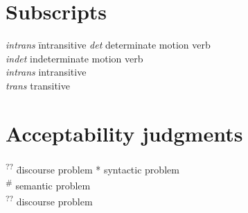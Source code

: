 \section*{Subscripts}
\begin{tabbing}
\textit{intrans} \hspace{1em} \= intransitive\kill
\textit{det}     \> determinate motion verb\\
\textit{indet}   \> indeterminate motion verb\\
\textit{intrans} \> intransitive\\
\textit{trans}   \> transitive
\end{tabbing}

\section*{Acceptability judgments}
\begin{tabbing}
\textsuperscript{??} \hspace{1em}\= discourse problem\kill
* \> syntactic problem\\
\textsuperscript{\#} \> semantic problem\\
\textsuperscript{??} \> discourse problem
\end{tabbing}
